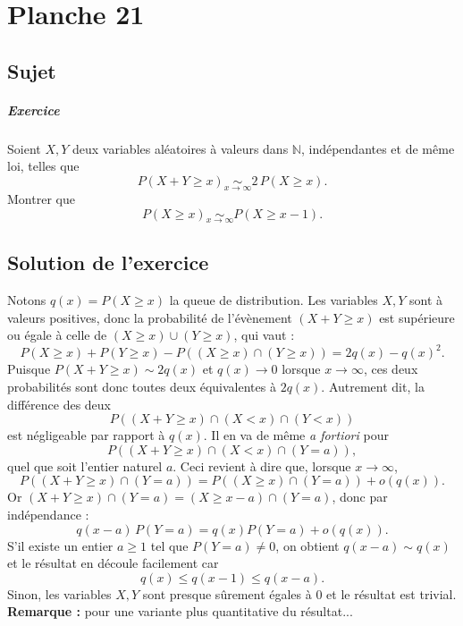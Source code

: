 \chapter{Planche 21}

\section{Sujet}

\paragraph{Exercice}

Soient $X,Y$ deux variables aléatoires à valeurs dans $\mathbb N$, indépendantes et de même loi, telles que
$$
P(X+Y \geqslant x) \underset{x\to\infty}\sim 2\,P(X \geqslant x).
$$
Montrer que
$$
P(X \geqslant x) \underset{x\to\infty}\sim P(X \geqslant x-1).
$$

\section{Solution de l'exercice}

Notons $q(x) = P(X \geqslant x)$ la queue de distribution. Les variables $X,Y$ sont à valeurs positives, donc la probabilité de l'évènement $(X + Y \geqslant x)$ est supérieure ou égale à celle de $(X\geqslant x) \cup (Y \geqslant x)$, qui vaut :
\[
P(X\geqslant x) + P(Y \geqslant x) - P((X\geqslant x) \cap (Y \geqslant x)) = 2q(x) - q(x)^2.
\]
Puisque $P(X+Y \geqslant x) \sim 2q(x)$ et $q(x) \to 0$  lorsque $x \to \infty$, ces deux probabilités sont donc toutes deux équivalentes à $2q(x)$. Autrement dit, la différence des deux 
\[
P((X + Y \geqslant x) \cap (X < x) \cap (Y < x)) 
\]
est négligeable par rapport à $q(x)$. Il en va de même \textit{a fortiori} pour
\[
P((X + Y \geqslant x) \cap (X < x) \cap (Y = a)),
\]
quel que soit l'entier naturel $a$. Ceci revient à dire que, lorsque $x \to \infty$,
\[
P((X+Y \geqslant x) \cap (Y = a)) = P((X \geqslant x) \cap (Y = a)) + o(q(x)).
\]
Or $(X+Y \geqslant x) \cap (Y=a) = (X \geqslant x - a) \cap (Y=a)$, donc par indépendance :
\[
q(x-a)\,P(Y = a) = q(x) P(Y = a) + o(q(x)).
\]
S'il existe un entier $a \geqslant 1$ tel que $P(Y = a) \neq 0$, on obtient $q(x - a) \sim q(x)$ et le résultat en découle facilement car
\[
q(x) \leqslant q(x-1) \leqslant q(x-a).
\]
Sinon, les variables $X,Y$ sont presque sûrement égales à $0$ et le résultat est trivial.\\


\textbf{Remarque : } pour une variante plus quantitative du résultat...\\

